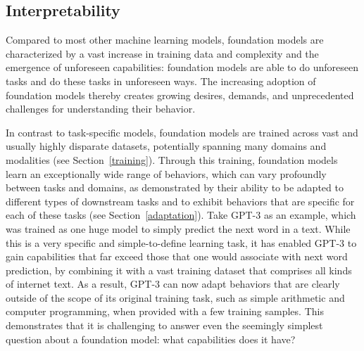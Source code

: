 \newsection
\subsection{Interpretability}
\label{sec:interpretability}

Compared to most other machine learning models, foundation models are characterized by a vast increase in training data and complexity and the emergence of unforeseen capabilities: foundation models are able to do unforeseen tasks and do these tasks in unforeseen ways. The increasing adoption of foundation models thereby creates growing desires, demands, and unprecedented challenges for understanding their behavior.

In contrast to task-specific models, foundation models are trained across vast and usually highly disparate datasets, potentially spanning many domains and modalities (see Section~\ref{training}).
Through this training, foundation models learn an exceptionally wide range of behaviors, which can vary profoundly between tasks and domains, as demonstrated by their ability to be adapted to different types of downstream tasks and to exhibit behaviors that are specific for each of these tasks (see Section~\ref{adaptation}).
Take GPT-3 as an example, which was trained as one huge model to simply predict the next word in a text. While this is a very specific and simple-to-define learning task, it has enabled GPT-3 to gain capabilities that far exceed those that one would associate with next word prediction, by combining it with a vast training dataset that comprises all kinds of internet text. As a result, GPT-3 can now adapt behaviors that are clearly outside of the scope of its original training task, such as simple arithmetic and computer programming, when provided with a few training samples. This demonstrates that it is challenging to answer even the seemingly simplest question about a foundation model: what capabilities does it have?

